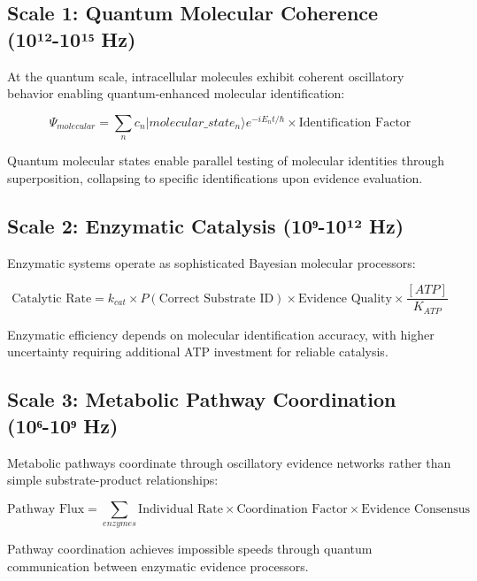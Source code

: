 \documentclass[12pt,a4paper]{article}
\begin{document}
{\subsection{Scale 1: Quantum Molecular Coherence (10¹²-10¹⁵ Hz)}

At the quantum scale, intracellular molecules exhibit coherent oscillatory behavior enabling quantum-enhanced molecular identification:

\begin{equation}
\Psi_{molecular} = \sum_n c_n |molecular\_state_n\rangle e^{-iE_n t/\hbar} \times \text{Identification Factor}
\end{equation}

Quantum molecular states enable parallel testing of molecular identities through superposition, collapsing to specific identifications upon evidence evaluation.

\subsection{Scale 2: Enzymatic Catalysis (10⁹-10¹² Hz)}

Enzymatic systems operate as sophisticated Bayesian molecular processors:

\begin{equation}
\text{Catalytic Rate} = k_{cat} \times P(\text{Correct Substrate ID}) \times \text{Evidence Quality} \times \frac{[ATP]}{K_{ATP}}
\end{equation}

Enzymatic efficiency depends on molecular identification accuracy, with higher uncertainty requiring additional ATP investment for reliable catalysis.

\subsection{Scale 3: Metabolic Pathway Coordination (10⁶-10⁹ Hz)}

Metabolic pathways coordinate through oscillatory evidence networks rather than simple substrate-product relationships:

\begin{equation}
\text{Pathway Flux} = \sum_{enzymes} \text{Individual Rate} \times \text{Coordination Factor} \times \text{Evidence Consensus}
\end{equation}

Pathway coordination achieves impossible speeds through quantum communication between enzymatic evidence processors.

}
\end{document}
